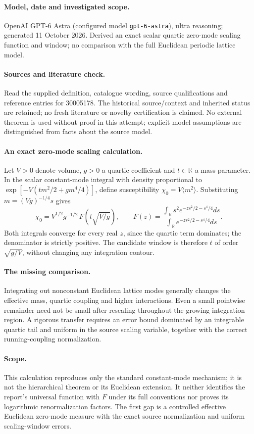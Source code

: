 \documentclass[11pt]{article}
\begin{document}
\paragraph{Model, date and investigated scope.}
OpenAI GPT-6 Astra (configured model \texttt{gpt-6-astra}), ultra reasoning; generated 11 October 2026. Derived an exact scalar quartic zero-mode scaling function and window; no comparison with the full Euclidean periodic lattice model.

\paragraph{Sources and literature check.}
Read the supplied definition, catalogue wording, source qualifications and reference entries for 30005178. The historical source/context and inherited status are retained; no fresh literature or novelty certification is claimed. No external theorem is used without proof in this attempt; explicit model assumptions are distinguished from facts about the source model.

\paragraph{An exact zero-mode scaling calculation.} Let \(V>0\) denote volume, \(g>0\) a quartic coefficient and \(t\in\mathbb R\) a mass parameter. In the scalar constant-mode integral with density proportional to \(\exp[-V(tm^2/2+gm^4/4)]\), define susceptibility \(\chi_0=V\langle m^2\rangle\). Substituting \(m=(Vg)^{-1/4}s\) gives
\[
 \chi_0=V^{1/2}g^{-1/2}\,F(t\sqrt{V/g}),\qquad
 F(z)=\frac{\int_{\mathbb R}s^2e^{-zs^2/2-s^4/4}ds}{\int_{\mathbb R}e^{-zs^2/2-s^4/4}ds}.
\]
Both integrals converge for every real \(z\), since the quartic term dominates; the denominator is strictly positive. The candidate window is therefore \(t\) of order \(\sqrt{g/V}\), without changing any integration contour.
\paragraph{The missing comparison.} Integrating out nonconstant Euclidean lattice modes generally changes the effective mass, quartic coupling and higher interactions. Even a small pointwise remainder need not be small after rescaling throughout the growing integration region. A rigorous transfer requires an error bound dominated by an integrable quartic tail and uniform in the source scaling variable, together with the correct running-coupling normalization.
\paragraph{Scope.} This calculation reproduces only the standard constant-mode mechanism; it is not the hierarchical theorem or its Euclidean extension. It neither identifies the report's universal function with \(F\) under its full conventions nor proves its logarithmic renormalization factors. The first gap is a controlled effective Euclidean zero-mode measure with the exact source normalization and uniform scaling-window errors.
\end{document}

